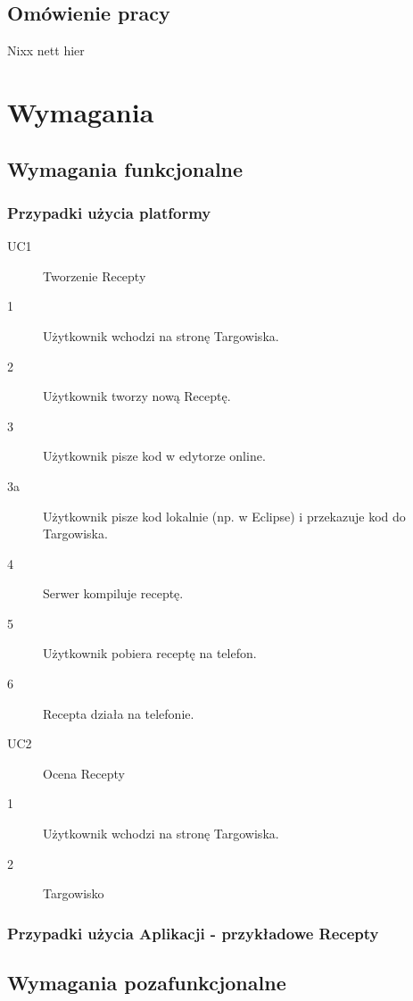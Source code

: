 \documentclass[11pt,a4paper,polish,thesis]{dcsbook}
\begin{document}
\section{Omówienie pracy}
Nixx nett hier

\chapter{Wymagania}
\section{Wymagania funkcjonalne}
\subsection{Przypadki użycia platformy}
\begin{description}
\item[UC1] Tworzenie Recepty
\item[1] Użytkownik wchodzi na stronę Targowiska.
\item[2]Użytkownik tworzy nową Receptę.
\item[3]Użytkownik pisze kod w edytorze online.
\item[3a]Użytkownik pisze kod lokalnie (np. w Eclipse) i przekazuje kod do Targowiska.
\item[4]Serwer kompiluje receptę.
\item[5]Użytkownik pobiera receptę na telefon.
\item[6]Recepta działa na telefonie.

\item[UC2] Ocena Recepty
\item[1] Użytkownik wchodzi na stronę Targowiska.
\item[2] Targowisko  


\end{description}
\subsection{Przypadki użycia Aplikacji - przykładowe Recepty}
\section{Wymagania pozafunkcjonalne}
\end{document}
